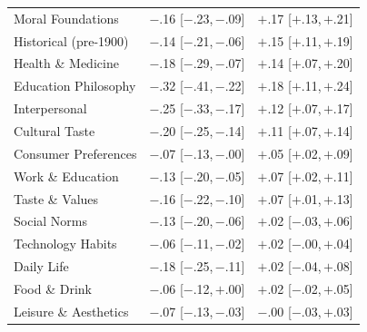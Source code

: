 \begin{table}[h]
\begin{tabular}{l r r}
Moral Foundations & $-$.16 \scriptsize{[$-$.23,\,$-$.09]} & $+$.17 \scriptsize{[$+$.13,\,$+$.21]} \\
Historical (pre-1900) & $-$.14 \scriptsize{[$-$.21,\,$-$.06]} & $+$.15 \scriptsize{[$+$.11,\,$+$.19]} \\
Health \& Medicine & $-$.18 \scriptsize{[$-$.29,\,$-$.07]} & $+$.14 \scriptsize{[$+$.07,\,$+$.20]} \\
Education Philosophy & $-$.32 \scriptsize{[$-$.41,\,$-$.22]} & $+$.18 \scriptsize{[$+$.11,\,$+$.24]} \\
Interpersonal & $-$.25 \scriptsize{[$-$.33,\,$-$.17]} & $+$.12 \scriptsize{[$+$.07,\,$+$.17]} \\
Cultural Taste & $-$.20 \scriptsize{[$-$.25,\,$-$.14]} & $+$.11 \scriptsize{[$+$.07,\,$+$.14]} \\
Consumer Preferences & $-$.07 \scriptsize{[$-$.13,\,$-$.00]} & $+$.05 \scriptsize{[$+$.02,\,$+$.09]} \\
Work \& Education & $-$.13 \scriptsize{[$-$.20,\,$-$.05]} & $+$.07 \scriptsize{[$+$.02,\,$+$.11]} \\
Taste \& Values & $-$.16 \scriptsize{[$-$.22,\,$-$.10]} & $+$.07 \scriptsize{[$+$.01,\,$+$.13]} \\
Social Norms & $-$.13 \scriptsize{[$-$.20,\,$-$.06]} & $+$.02 \scriptsize{[$-$.03,\,$+$.06]} \\
Technology Habits & $-$.06 \scriptsize{[$-$.11,\,$-$.02]} & $+$.02 \scriptsize{[$-$.00,\,$+$.04]} \\
Daily Life & $-$.18 \scriptsize{[$-$.25,\,$-$.11]} & $+$.02 \scriptsize{[$-$.04,\,$+$.08]} \\
Food \& Drink & $-$.06 \scriptsize{[$-$.12,\,$+$.00]} & $+$.02 \scriptsize{[$-$.02,\,$+$.05]} \\
Leisure \& Aesthetics & $-$.07 \scriptsize{[$-$.13,\,$-$.03]} & $-$.00 \scriptsize{[$-$.03,\,$+$.03]} \\
\bottomrule
\end{tabular}
\end{table}
